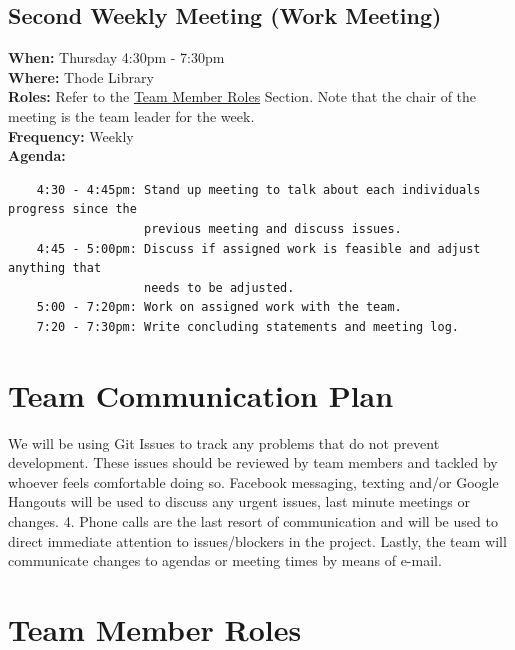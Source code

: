 \documentclass{article}
\begin{document}
\subsection{Second Weekly Meeting (Work Meeting)}
\textbf{When:} Thursday 4:30pm - 7:30pm\\
\textbf{Where:} Thode Library\\
\textbf{Roles:} Refer to the \hyperref[TeamMemberRoles]{Team Member Roles} Section. Note that the chair of the meeting is the team leader for the week. \\
\textbf{Frequency:} Weekly\\
\textbf{Agenda:}
\begin{verbatim}
    4:30 - 4:45pm: Stand up meeting to talk about each individuals progress since the
                   previous meeting and discuss issues.
    4:45 - 5:00pm: Discuss if assigned work is feasible and adjust anything that
                   needs to be adjusted. 
    5:00 - 7:20pm: Work on assigned work with the team.  
    7:20 - 7:30pm: Write concluding statements and meeting log.  
\end{verbatim}


\section{Team Communication Plan}
We will be using Git Issues to track any problems that do not prevent development. These issues should be reviewed by team members and tackled by whoever feels comfortable doing so. Facebook messaging, texting and/or Google Hangouts will be used to discuss any urgent issues, last minute meetings or changes. 
4. Phone calls are the last resort of communication and will be used to direct immediate attention to issues/blockers in the project. Lastly, the team will communicate changes to agendas or meeting times by means of e-mail.

\section{Team Member Roles}
\end{document}
